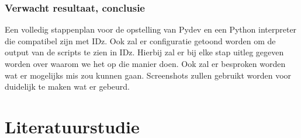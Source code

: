 \section{Verwacht resultaat, conclusie}%
\label{sec:verwachte_resultaten}
Een volledig stappenplan voor de opstelling van Pydev en een Python interpreter die compatibel zijn met IDz. Ook zal er configuratie getoond worden om de output van de scripts te zien in IDz. Hierbij zal er bij elke stap uitleg gegeven worden over waarom we het op die manier doen. Ook zal er besproken worden wat er mogelijks mis zou kunnen gaan. Screenshots zullen gebruikt worden voor duidelijk te maken wat er gebeurd.


\part{Literatuurstudie}
